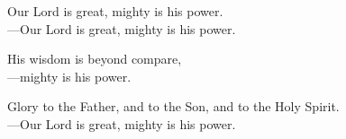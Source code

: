 \responsory

\noindent Our Lord is great, mighty is his power.\\
{\color{red}---\thinspace}Our Lord is great, mighty is his power.

\medskip\noindent His wisdom is beyond compare,\\
{\color{red}---\thinspace}mighty is his power.

\medskip\noindent Glory to the Father, and to the Son, and to the Holy Spirit.\\
{\color{red}---\thinspace}Our Lord is great, mighty is his power.
